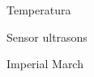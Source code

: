 \documentclass{beamer}
\begin{document}
\begin{frame}{Temperatura}

\end{frame}



\begin{frame}{Sensor ultrasons}

\end{frame}


\begin{frame}{Imperial March}

\end{frame}
%
%
%
%
%
%
\end{document}
